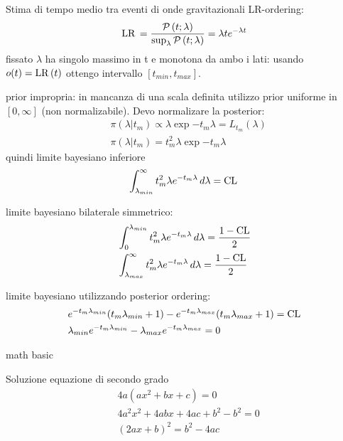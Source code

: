\begin{wordonframe}{Stima di tempo medio tra eventi di onde gravitazionali}
LR-ordering:
\begin{equation*}
\operatorname{LR}{}=\frac{\operatorname{\mathcal{P}}{(t;\lambda)}}{\sup_{\lambda}\operatorname{\mathcal{P}}{(t;\lambda)}}=\lambda te^{-\lambda t}
\end{equation*}
fissato $\lambda$ ha singolo massimo in t e monotona da ambo i lati: usando $o(t)=\operatorname{LR}{(t)}$ ottengo intervallo $[t_{min},t_{max}]$.

prior impropria: in mancanza di una scala definita utilizzo prior uniforme in $[0,\infty]$ (non normalizabile). Devo normalizare la posterior:
\begin{align*}
&\pi(\lambda|t_m)\propto \lambda\exp{-t_m\lambda}=L_{t_m}(\lambda)\\
&\pi(\lambda|t_m)=t_m^2\lambda\exp{-t_m\lambda}
\end{align*}
quindi limite bayesiano inferiore
\begin{equation*}
\int_{\lambda_{min}}^{\infty}t_m^2\lambda e^{-t_m\lambda}\,d\lambda=\operatorname{CL}{}
\end{equation*}

limite bayesiano bilaterale simmetrico:
\begin{align*}
&\int_0^{\lambda_{min}}t_m^2\lambda e^{-t_m\lambda}\,d\lambda=\frac{1-\operatorname{CL}}{2}\\
&\int_{\lambda_{max}}^{\infty}t_m^2\lambda e^{-t_m\lambda}\,d\lambda=\frac{1-\operatorname{CL}}{2}
\end{align*}

limite bayesiano utilizzando posterior ordering:
\begin{align*}
&e^{-t_m\lambda_{min}}(t_m\lambda_{min}+1)-e^{-t_m\lambda_{max}}(t_m\lambda_{max}+1)=\operatorname{CL}\\
&\lambda_{min}e^{-t_m\lambda_{min}}-\lambda_{max}e^{-t_m\lambda_{max}}=0
\end{align*}


\end{wordonframe}

\begin{wordonframe}{math basic}
\begin{block}{Soluzione equazione di secondo grado}
\begin{align*}
&4a(ax^2+bx+c)=0\\
&4a^2x^2+4abx+4ac+b^2-b^2=0\\
&(2ax+b)^2=b^2-4ac
\end{align*}
\end{block}

\end{wordonframe}
